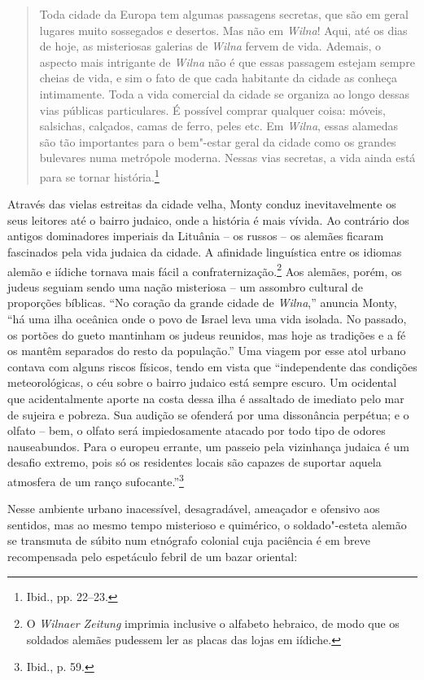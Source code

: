 \begin{quote}
Toda cidade da Europa tem algumas passagens secretas, que são em geral
lugares muito sossegados e desertos. Mas não em \textit{Wilna}! Aqui, até os dias
de hoje, as misteriosas galerias de \textit{Wilna} fervem de vida. Ademais, o
aspecto mais intrigante de \textit{Wilna} não é que essas passagem estejam sempre
cheias de vida, e sim o fato de que cada habitante da cidade as conheça
intimamente. Toda a vida comercial da cidade se organiza ao longo dessas
vias públicas particulares. É possível comprar qualquer coisa: móveis,
salsichas, calçados, camas de ferro, peles etc. Em \textit{Wilna}, essas alamedas
são tão importantes para o bem"-estar geral da cidade como os grandes
bulevares numa metrópole moderna. Nessas vias secretas, a vida ainda
está para se tornar história.\footnote{Ibid., pp. 22--23.}
\end{quote}

Através das vielas estreitas da cidade velha, Monty conduz
inevitavelmente os seus leitores até o bairro judaico, onde a história é
mais vívida. Ao contrário dos antigos dominadores imperiais da Lituânia
-- os russos -- os alemães ficaram fascinados pela vida judaica da cidade.
A afinidade linguística entre os idiomas alemão e iídiche tornava mais
fácil a confraternização.\footnote{O \textit{Wilnaer Zeitung} imprimia inclusive o
alfabeto hebraico, de modo que os soldados alemães pudessem ler as
placas das lojas em iídiche.} Aos alemães, porém, os judeus seguiam
sendo uma nação misteriosa -- um assombro cultural de proporções
bíblicas. ``No coração da grande cidade de \textit{Wilna},'' anuncia Monty, ``há
uma ilha oceânica onde o povo de Israel leva uma vida isolada. No
passado, os portões do gueto mantinham os judeus reunidos, mas hoje as
tradições e a fé os mantêm separados do resto da população.'' Uma viagem
por esse atol urbano contava com alguns riscos físicos, tendo em vista
que ``independente das condições meteorológicas, o céu sobre o bairro
judaico está sempre escuro. Um ocidental que acidentalmente aporte na
costa dessa ilha é assaltado de imediato pelo mar de sujeira e pobreza.
Sua audição se ofenderá por uma dissonância perpétua; e o olfato -- bem,
o olfato será impiedosamente atacado por todo tipo de odores
nauseabundos. Para o europeu errante, um passeio pela vizinhança judaica
é um desafio extremo, pois só os residentes locais são capazes de
suportar aquela atmosfera de um ranço sufocante.''\footnote{Ibid., p. 59.}

Nesse ambiente urbano inacessível, desagradável, ameaçador e ofensivo
aos sentidos, mas ao mesmo tempo misterioso e quimérico, o
soldado"-esteta alemão se transmuta de súbito num etnógrafo colonial cuja
paciência é em breve recompensada pelo espetáculo febril de um bazar
oriental:

